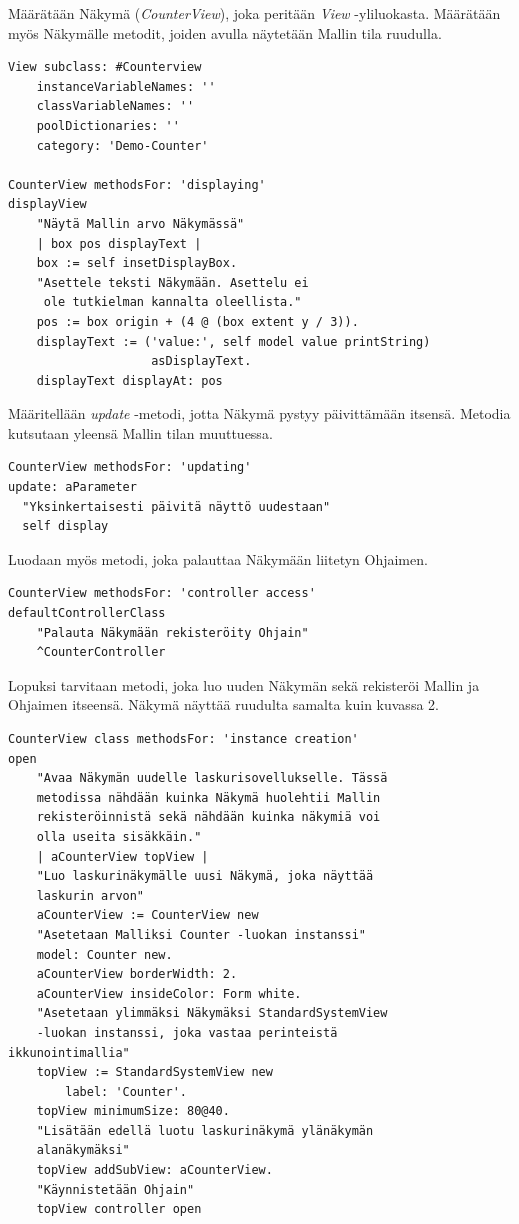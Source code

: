 \documentclass[utf8]{gradu3}
\begin{document}
Määrätään Näkymä (\emph{CounterView}), joka peritään \emph{View} -yliluokasta. Määrätään
myös Näkymälle metodit, joiden avulla näytetään Mallin tila ruudulla.
\begin{lstlisting}[language=Smalltalk]
View subclass: #Counterview
	instanceVariableNames: ''
	classVariableNames: ''
	poolDictionaries: ''
	category: 'Demo-Counter'

CounterView methodsFor: 'displaying'
displayView
	"Näytä Mallin arvo Näkymässä"
	| box pos displayText |
	box := self insetDisplayBox.
	"Asettele teksti Näkymään. Asettelu ei
	 ole tutkielman kannalta oleellista."
	pos := box origin + (4 @ (box extent y / 3)).
	displayText := ('value:', self model value printString)
					asDisplayText.
	displayText displayAt: pos
\end{lstlisting}
Määritellään \emph{update} -metodi, jotta Näkymä pystyy päivittämään itsensä. Metodia kutsutaan
yleensä Mallin tilan muuttuessa.
\begin{lstlisting}[language=Smalltalk]
CounterView methodsFor: 'updating'
update: aParameter
  "Yksinkertaisesti päivitä näyttö uudestaan"
  self display
\end{lstlisting}
Luodaan myös metodi, joka palauttaa Näkymään liitetyn Ohjaimen.
\begin{lstlisting}[language=Smalltalk]
CounterView methodsFor: 'controller access'
defaultControllerClass
	"Palauta Näkymään rekisteröity Ohjain"
	^CounterController
\end{lstlisting}
Lopuksi tarvitaan metodi, joka luo uuden Näkymän sekä rekisteröi Mallin ja Ohjaimen itseensä. Näkymä näyttää ruudulta
samalta kuin kuvassa 2.
\begin{lstlisting}[language=Smalltalk]
CounterView class methodsFor: 'instance creation'
open
	"Avaa Näkymän uudelle laskurisovellukselle. Tässä 
	metodissa nähdään kuinka Näkymä huolehtii Mallin 
	rekisteröinnistä sekä nähdään kuinka näkymiä voi 
	olla useita sisäkkäin."
	| aCounterView topView |
	"Luo laskurinäkymälle uusi Näkymä, joka näyttää 
	laskurin arvon"
	aCounterView := CounterView new
	"Asetetaan Malliksi Counter -luokan instanssi"
	model: Counter new.
	aCounterView borderWidth: 2.
	aCounterView insideColor: Form white.
	"Asetetaan ylimmäksi Näkymäksi StandardSystemView 
	-luokan instanssi, joka vastaa perinteistä
ikkunointimallia"
	topView := StandardSystemView new
		label: 'Counter'.
	topView minimumSize: 80@40.
	"Lisätään edellä luotu laskurinäkymä ylänäkymän 
	alanäkymäksi"
	topView addSubView: aCounterView.
	"Käynnistetään Ohjain"
	topView controller open
\end{lstlisting}
\end{document}
